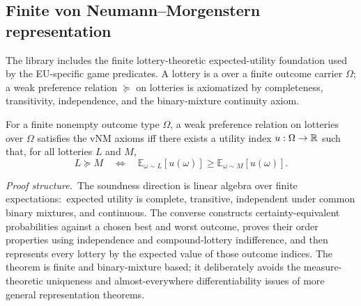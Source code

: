 
\subsection{Finite von Neumann--Morgenstern representation}
\label{sec:theorems:vnm}

The library includes the finite lottery-theoretic expected-utility
foundation used by the EU-specific game predicates.  A lottery is a
 over a finite outcome carrier $\Omega$; a weak preference
relation $\succeq$ on lotteries is axiomatized by completeness,
transitivity, independence, and the binary-mixture continuity axiom.

\begin{theorem}
\label{thm:vnm-representation}
For a finite nonempty outcome type $\Omega$, a weak preference
relation on lotteries over $\Omega$ satisfies the vNM axioms iff
there exists a utility index $u : \Omega \to \mathbb{R}$ such that, for all
lotteries $L$ and $M$,
\[
  L \succeq M
  \quad\Longleftrightarrow\quad
  \mathbb{E}_{\omega\sim L}[u(\omega)]
    \ge
  \mathbb{E}_{\omega\sim M}[u(\omega)].
\]
\end{theorem}

\noindent\emph{Proof structure.}\ The soundness direction is
linear algebra over finite expectations:\ expected utility is
complete, transitive, independent under common binary mixtures, and
continuous.  The converse constructs certainty-equivalent
probabilities against a chosen best and worst outcome, proves their
order properties using independence and compound-lottery
indifference, and then represents every lottery by the expected value
of those outcome indices.  The theorem is finite and binary-mixture
based; it deliberately avoids the measure-theoretic uniqueness and
almost-everywhere differentiability issues of more general
representation theorems.


